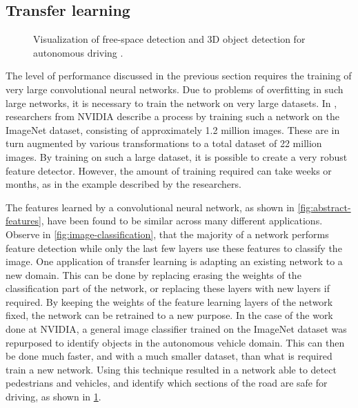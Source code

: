 \documentclass[\rootfolder/main.tex]{subfiles}
\begin{document}
\subsection{Transfer learning}

\begin{figure}
    \caption{Visualization of free-space detection and 3D object detection for autonomous driving \cite{NVIDIA}.\label{fig:nvidia-cnn}}
\end{figure}

The level of performance discussed in the previous section requires the training of very large convolutional neural networks.
Due to problems of overfitting in such large networks, it is necessary to train the network on very large datasets.
In \cite{NVIDIA}, researchers from NVIDIA describe a process by training such a network on the ImageNet dataset, consisting of approximately 1.2 million images.
These are in turn augmented by various transformations to a total dataset of 22 million images.
By training on such a large dataset, it is possible to create a very robust feature detector.
However, the amount of training required can take weeks or months, as in the example described by the researchers.

The features learned by a convolutional neural network, as shown in \cref{fig:abstract-features}, have been found to be similar across many different applications.
Observe in \cref{fig:image-classification}, that the majority of a network performs feature detection while only the last few layers use these features to classify the image.
One application of transfer learning is adapting an existing network to a new domain.
This can be done by replacing erasing the weights of the classification part of the network, or replacing these layers with new layers if required.
By keeping the weights of the feature learning layers of the network fixed, the network can be retrained to a new purpose.
In the case of the work done at NVIDIA, a general image classifier trained on the ImageNet dataset was repurposed to identify objects in the autonomous vehicle domain.
This can then be done much faster, and with a much smaller dataset, than what is required train a new network.
Using this technique resulted in a network able to detect pedestrians and vehicles, and identify which sections of the road are safe for driving, as shown in \cref{fig:nvidia-cnn}.

\end{document}
